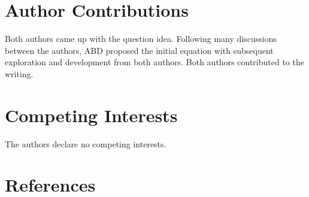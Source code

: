 \documentclass[
]{article}
\begin{document}
\hypertarget{author-contributions}{%
\section{Author Contributions}\label{author-contributions}}

Both authors came up with the question idea. Following many discussions
between the authors, ABD proposed the initial equation with subsequent
exploration and development from both authors. Both authors contributed
to the writing.

\hypertarget{competing-interests}{%
\section{Competing Interests}\label{competing-interests}}

The authors declare no competing interests.

\hypertarget{references}{%
\section*{References}\label{references}}
\end{document}
